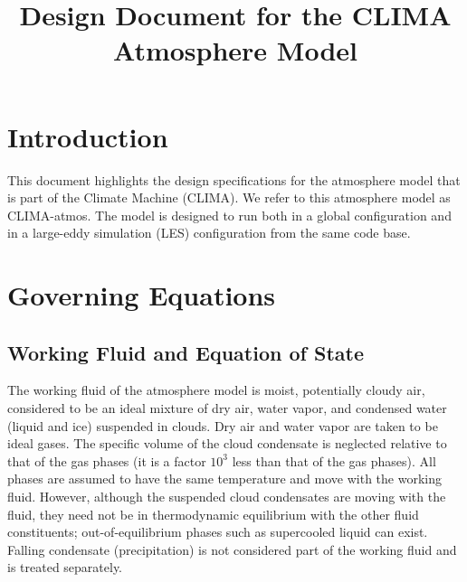 \documentclass{article}
\title{Design Document for the CLIMA Atmosphere Model}
\author{ }
\begin{document}
\maketitle
\tableofcontents

\section{Introduction}
\label{sec:introduction}

This document highlights the design specifications for the atmosphere model that is part of the Climate Machine (CLIMA). We refer to this atmosphere model as CLIMA-atmos. The model is designed to run both in a global configuration and in a large-eddy simulation (LES) configuration from the same code base.  

\section{Governing Equations}
\label{sec:governing_equations}

\subsection{Working Fluid and Equation of State}

The working fluid of the atmosphere model is moist, potentially cloudy air, considered to be an ideal mixture of dry air, water vapor, and condensed water (liquid and ice) suspended in clouds. Dry air and water vapor are taken to be ideal gases. The specific volume of the cloud condensate is neglected relative to that of the gas phases (it is a  factor $10^{3}$ less than that of the gas phases). All phases are assumed to have the same temperature and move with the working fluid. However, although the suspended cloud condensates are moving with the fluid, they need not be in thermodynamic equilibrium with the other fluid constituents; out-of-equilibrium phases such as supercooled liquid can exist. Falling condensate (precipitation) is not considered part of the working fluid and is treated separately.
\end{document}
